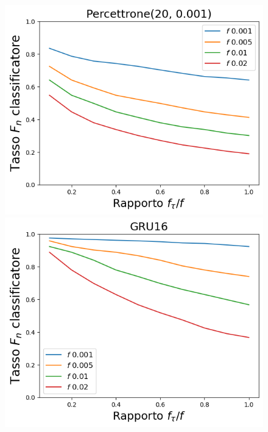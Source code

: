 \documentclass{beamer}
\begin{document}
\begin{frame}
\begin{figure}[htbp]
    \centering
    \begin{minipage}{0.25\textwidth}
    \centering
    \includegraphics[width=\textwidth]{immagini/7/LBF/Percettrone(20, 0.001)_FNR.png}
    \end{minipage}%
    \hfill
    \begin{minipage}{0.25\textwidth}
    \centering
    \includegraphics[width=\textwidth]{immagini/7/LBF/GRU16_FNR.png}
    \end{minipage}%
    \hfill
    \begin{minipage}{0.25\textwidth}
    \centering

\end{minipage}
\end{figure}
\end{frame}
\end{document}
